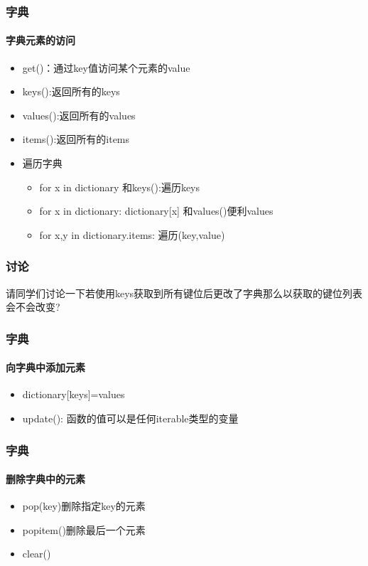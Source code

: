 \documentclass{beamer}
\begin{document}
\begin{frame}[t]
	\frametitle{字典}
	\framesubtitle{字典元素的访问}
	\begin{itemize}
		\item get()：通过key值访问某个元素的value
		\item keys():返回所有的keys
		\item values():返回所有的values
		\item items():返回所有的items
		\item 遍历字典
		      \begin{itemize}
			      \item for x in dictionary 和keys():遍历keys
			      \item for x in dictionary: dictionary[x] 和values()便利values
			      \item for x,y in dictionary.items: 遍历(key,value)
		      \end{itemize}

	\end{itemize}


\end{frame}
\begin{frame}[t]
	\frametitle{讨论}
	请同学们讨论一下若使用keys获取到所有键位后更改了字典那么以获取的键位列表会不会改变?

	
\end{frame}
\begin{frame}[t]
	\frametitle{字典}
	\framesubtitle{向字典中添加元素}
	\begin{itemize}
		\item dictionary[keys]=values
		\item update(): 函数的值可以是任何iterable类型的变量
	\end{itemize}

\end{frame}
\begin{frame}[t]
	\frametitle{字典}
	\framesubtitle{删除字典中的元素}
	\begin{itemize}
		\item pop(key)删除指定key的元素
		\item popitem()删除最后一个元素
		\item clear()
	\end{itemize}
\end{frame}
\end{document}
